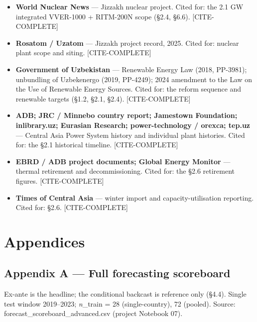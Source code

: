 \documentclass[10pt,twocolumn]{article}
\newcommand{\mkdone}[1]{{\color{metagrey}\footnotesize #1}}
\begin{document}
\begin{itemize}[leftmargin=1.2em,itemsep=1pt,topsep=2pt]

\item \textbf{World Nuclear News} --- Jizzakh nuclear project. Cited for: the 2.1 GW integrated VVER-1000 + RITM-200N scope (\S{}2.4, \S{}6.6). \mkdone{[CITE-COMPLETE]}

\item \textbf{Rosatom / Uzatom} --- Jizzakh project record, 2025. Cited for: nuclear plant scope and siting. \mkdone{[CITE-COMPLETE]}

\item \textbf{Government of Uzbekistan} --- Renewable Energy Law (2018, PP-3981); unbundling of Uzbekenergo (2019, PP-4249); 2024 amendment to the Law on the Use of Renewable Energy Sources. Cited for: the reform sequence and renewable targets (\S{}1.2, \S{}2.1, \S{}2.4). \mkdone{[CITE-COMPLETE]}

\item \textbf{ADB; JRC / Minnebo country report; Jamestown Foundation; inlibrary.uz; Eurasian Research; power-technology / orexca; tep.uz} --- Central Asia Power System history and individual plant histories. Cited for: the \S{}2.1 historical timeline. \mkdone{[CITE-COMPLETE]}

\item \textbf{EBRD / ADB project documents; Global Energy Monitor} --- thermal retirement and decommissioning. Cited for: the \S{}2.6 retirement figures. \mkdone{[CITE-COMPLETE]}

\item \textbf{Times of Central Asia} --- winter import and capacity-utilisation reporting. Cited for: \S{}2.6. \mkdone{[CITE-COMPLETE]}

\end{itemize}

\section*{Appendices}

\subsection*{Appendix A --- Full forecasting scoreboard}

Ex-ante is the headline; the conditional backcast is reference only (\S{}4.4). Single test window 2019--2023; \textit{n}\_train = 28 (single-country), 72 (pooled). Source: forecast\_scoreboard\_advanced.csv (project Notebook 07).
\end{document}
